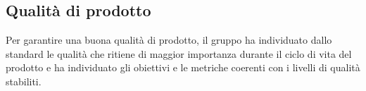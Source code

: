 
	
	\subsection{Qualità di prodotto} \label{sec:qualprodotto}
	Per garantire una buona qualità di prodotto, il gruppo \hx{} ha individuato dallo standard  le qualità che ritiene di maggior importanza durante il ciclo di vita del prodotto e ha individuato gli obiettivi e le metriche coerenti con i livelli di qualità stabiliti.
